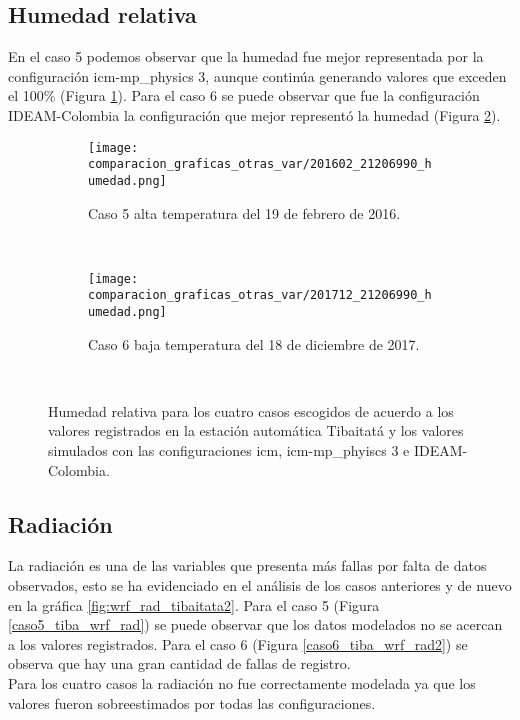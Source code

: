 \subsection{Humedad relativa}

En el caso 5 podemos observar que la humedad fue mejor representada por la configuración icm-mp\_physics 3, aunque continúa generando valores que exceden el 100\% (Figura \ref{caso5_tiba_wrf_hum}). Para el caso 6 se puede observar que fue la configuración IDEAM-Colombia la configuración que mejor representó la humedad (Figura \ref{caso6_tiba_wrf_hum}).



\begin{figure}[H]
\centering
\begin{subfigure}[normla]{0.4\textwidth}
\caption{Caso 5 alta temperatura del 19 de febrero de 2016.}
\label{caso5_tiba_wrf_hum}
\texttt{[image: comparacion\_graficas\_otras\_var/201602\_21206990\_humedad.png]}
\end{subfigure}
~
\begin{subfigure}[normla]{0.4\textwidth}
\caption{Caso 6 baja temperatura del 18 de diciembre de 2017.}
\label{caso6_tiba_wrf_hum}
\texttt{[image: comparacion\_graficas\_otras\_var/201712\_21206990\_humedad.png]}
\end{subfigure}
~

    \caption{Humedad relativa para los cuatro casos escogidos de acuerdo a los valores registrados en la  estación automática Tibaitatá y los valores simulados con las configuraciones icm, icm-mp\_phyiscs 3 e IDEAM-Colombia.}
    \label{fig:wrf_hum_tibaitata}
\end{figure}


\subsection{Radiación}


La radiación es una de las variables que presenta más fallas por falta de datos observados, esto se ha evidenciado en el análisis de los casos anteriores y de nuevo en la gráfica \ref{fig:wrf_rad_tibaitata2}. Para el caso 5 (Figura \ref{caso5_tiba_wrf_rad}) se puede observar que los datos modelados no se acercan a los valores registrados. Para el caso 6 (Figura \ref{caso6_tiba_wrf_rad2}) se observa que hay una gran cantidad de fallas de registro.\\

Para los cuatro casos la radiación no fue correctamente modelada ya que los valores fueron sobreestimados por todas las configuraciones.\\

